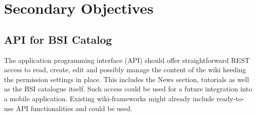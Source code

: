 \chapter{Secondary Objectives}
\section{API for BSI Catalog}

The application programming interface (API) should offer straightforward REST access to read, create, edit and possibly manage the content of the wiki heeding the permission settings in place.
This includes the News section, tutorials as well as the BSI catalogue itself.
Such access could be used for a future integration into a mobile application.
Existing wiki-frameworks might already include ready-to-use API functionalities and could be used.
